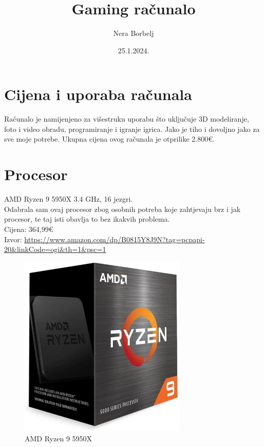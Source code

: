 \documentclass{report}
\begin{document}
\title{Gaming računalo}
\author{Nera Borbelj}
\date{25.1.2024.}
\maketitle
\tableofcontents
\listoffigures

\chapter{Cijena i uporaba računala}
Računalo je namijenjeno za višestruku uporabu što uključuje 3D modeliranje, foto i video obradu, programiranje i igranje igrica. Jako je tiho i dovoljno jako za sve moje potrebe. Ukupna cijena ovog računala je otprilike 2.800€.
 
\chapter{Procesor}
AMD Ryzen 9 5950X 3.4 GHz, 16 jezgri.
\\ Odabrala sam ovaj procesor zbog osobnih potreba koje zahtjevaju brz i jak procesor, te taj isti obavlja to bez ikakvih problema.
\\Cijena: 364,99€
\\Izvor:  \url{https://www.amazon.com/dp/B0815Y8J9N?tag=pcpapi-20&linkCode=ogi&th=1&psc=1}
\begin{figure}[h]
\includegraphics[width=8cm]{slike/procesor.jpg}
\caption{AMD Ryzen 9 5950X}
\end{figure}
\end{document}
